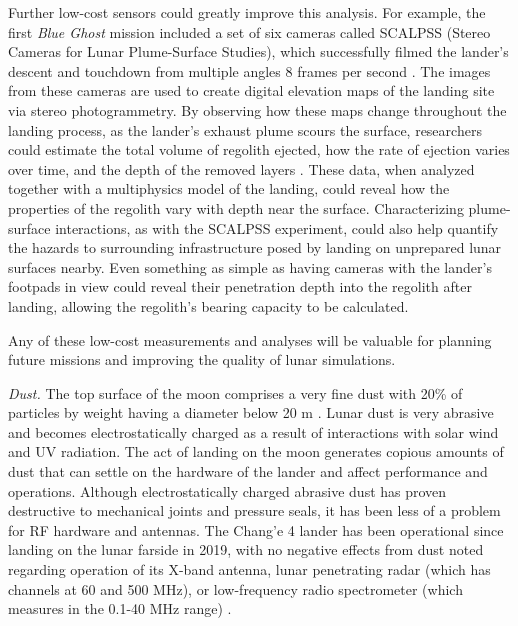 Further low-cost sensors could greatly improve this analysis.  For example, the first \textit{Blue Ghost} mission included a set of six cameras called SCALPSS (Stereo Cameras for Lunar Plume-Surface Studies), which successfully filmed the lander's descent and touchdown from multiple angles 8 frames per second \citep{Atkinson2025NASA}. The images from these cameras are used to create digital elevation maps of the landing site via stereo photogrammetry. By observing how these maps change throughout the landing process, as the lander's exhaust plume scours the surface, researchers could estimate the total volume of regolith ejected, how the rate of ejection varies over time, and the depth of the removed layers \citep{Tyrrell2022PlumeSurface}.  These data, when analyzed together with a multiphysics model of the landing, could reveal how the properties of the regolith vary with depth near the surface.  Characterizing plume-surface interactions, as with the SCALPSS experiment, could also help quantify the hazards to surrounding infrastructure posed by landing on unprepared lunar surfaces nearby.  Even something as simple as having cameras with the lander's footpads in view could reveal their penetration depth into the regolith after landing, allowing the regolith's bearing capacity to be calculated.  

Any of these low-cost measurements and analyses will be valuable for planning future missions and improving the quality of lunar simulations.


{\em Dust.} The top surface of the moon comprises a very fine dust with 20\% of particles by weight having a diameter below 20 \textmu m \citep{ZANON2023627}.  Lunar dust is very abrasive and becomes electrostatically charged as a result of interactions with solar wind and UV radiation.  The act of landing on the moon generates copious amounts of dust that can settle on the hardware of the lander and affect performance and operations. Although electrostatically charged abrasive dust has proven destructive to mechanical joints and pressure seals, it has been less of a problem for RF hardware and antennas.  The Chang'e 4 lander has been operational since landing on the lunar farside in 2019, with no negative effects from dust noted regarding operation of its X-band antenna, lunar penetrating radar (which has channels at 60 and 500 MHz), or low-frequency radio spectrometer (which measures in the 0.1-40 MHz range) \citep{JIA2018207}.

